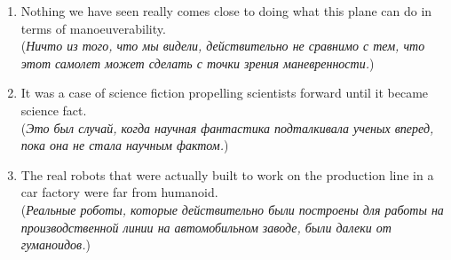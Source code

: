 \begin{enumerate}
      \item Nothing we have seen really comes close to doing what this plane can do in terms of manoeuverability.\\
            (\textit{Ничто из того, что мы видели, действительно не сравнимо с тем, что этот самолет может сделать с точки зрения маневренности.})

      \item It was a case of science fiction propelling scientists forward until it became science fact.\\
            (\textit{Это был случай, когда научная фантастика подталкивала ученых вперед, пока она не стала научным фактом.})

      \item The real robots that were actually built to work on the production line in a car factory were far from humanoid.\\
            (\textit{Реальные роботы, которые действительно были построены для работы на производственной линии на автомобильном заводе, были далеки от гуманоидов.})
\end{enumerate}

